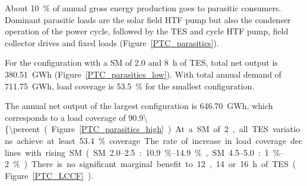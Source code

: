 About \SI{10}{\percent} of annual gross energy production goes to parasitic consumers. Dominant parasitic loads are the solar field HTF pump but also the condenser operation of the power cycle, followed by the TES and cycle HTF pump, field collector drives and fixed loads (Figure~\ref{PTC_parasitics}).

For the configuration with a SM of \num{2.0} and \SI{8}{h} of TES, total net output is \SI{380.51}{GWh} (Figure~\ref{PTC_parasitics_low}). With total annual demand of \SI{711.75}{GWh}, load coverage is \SI{53.5}{\percent} for the smallest configuration. 

The annual net output of the largest configuration is \SI{646.70}{GWh}, which corresponds to a load coverage of \SI{90.9\{\percent} (Figure~\ref{PTC_parasitics_high}).


At a SM of \num{2}, all TES variations achieve at least \SI{53.4}{\percent} coverage. The rate of increase in load coverage declines with rising SM (SM \numrange{2.0}{2.5}: \SIrange{10.9}{14.9}{\percent}, SM \numrange{4.5}{5.0}: \SIrange{1}{2}{\percent}) There is no significant marginal benefit to \num{12}, \num{14} or \SI{16}{h} of TES (Figure~\ref{PTC_LCCF}).

